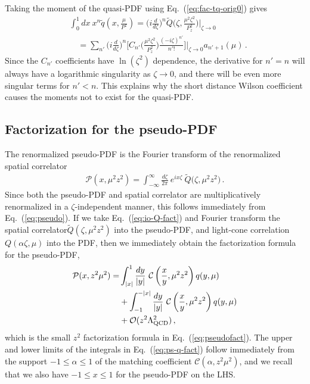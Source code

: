 \documentclass[prd,aps,twocolumn,preprintnumbers,showpacs,nofootinbib,superscriptaddress,notitlepage]{revtex4-1}
\newcommand{\nn}{\nonumber}
\newcommand{\spcorr}{spatial correlator\xspace}
\DeclareRobustCommand{\eq}[1]{Eq.~(\ref{eq:#1})}
\begin{document}
Taking the moment of the quasi-PDF using \eq{fac-tq-orig0} gives
\begin{align} \label{eq:momentqpdf}
 &\int_0^1\!\! dx\: x^n \tilde{q} \left( x, \frac{\mu}{P^z}\right)
= \Big(i\frac{d}{d\zeta}\Big)^n \tilde{Q} \biggl(\zeta, \frac{{\mu}^2\zeta^2}{P_z^2}\biggr) \Bigg|_{\zeta\to 0}
 \nn\\
& \quad =  \sum_{n'}  \Big(i\frac{d}{d\zeta}\Big)^n \bigg[ C_{n'} \Big(\frac{{\mu}^2 \zeta^2}{P_z^2}\Big)  \frac{(-i \zeta)^{n'}}{n'!} \bigg] \Bigg|_{\zeta\to 0}  a_{n' + 1}
\left(\mu\right) \,.
\end{align}
Since the $C_{n'}$ coefficients have $\ln(\zeta^2)$ dependence, the derivative for $n'=n$ will always have a logarithmic singularity as $\zeta\to 0$, and there will be even more singular terms for $n'<n$. This explains why the short distance Wilson coefficient causes the moments not to exist for the quasi-PDF.


\subsection{Factorization for the pseudo-PDF}

The renormalized pseudo-PDF is the Fourier transform of the renormalized \spcorr
\begin{align} \label{eq:pseudoRen}
\mathcal{P} \left( x, \mu^2 z^2\right)
   = \int_{-\infty}^\infty \! \frac{d \zeta}{2\pi}\:
    e^{ix \zeta}\: \tilde{Q}\bigl( \zeta, \mu^2 z^2 \bigr)
   \,.
\end{align}
Since both the pseudo-PDF and \spcorr are multiplicatively renormalized in a $\zeta$-independent manner, this follows immediately from \eq{pseudo}.
If we take \eq{io-Q-fact} and Fourier transform the \spcorr $\tilde Q(\zeta,\mu^2z^2)$ into the pseudo-PDF, and light-cone correlation $Q(\alpha\zeta,\mu)$ into the PDF, then we immediately obtain the factorization formula for the pseudo-PDF,
\begin{align}\label{eq:ps-q-fact}
\mathcal{P}(x,z^2\mu^2) =
 &\int_{|x|}^1 {dy\over |y|}\
  \mathcal{C}\left({x\over y},\mu^2 z^2\right) q(y,\mu)\nn\\
&+\int^{-|x|}_{-1} {dy\over |y|}\
  \mathcal{C}\left( \frac{x}{y}, \mu^2z^2\right) q(y,\mu)
  \nn \\
 &+ {\cal O}(z^2\Lambda_{\rm QCD}^2)\,,
\end{align}
which is the small $z^2$ factorization formula in Eq.~(\ref{eq:pseudofact}). The upper and lower limits of the integrals in \eq{ps-q-fact} follow immediately from the support $-1\le \alpha \le 1$ of the matching coefficient $\mathcal{C}(\alpha,z^2\mu^2)$, and we recall that we also have $-1\le x\le 1$ for the pseudo-PDF on the LHS.
\end{document}
